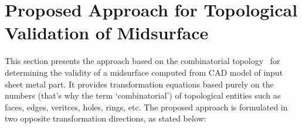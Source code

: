 \section{Proposed Approach for Topological Validation of Midsurface}

This section presents the approach based on the combinatorial topology~\cite{Hegde2013} for determining the validity of a midsurface computed from CAD model of input sheet metal part. It provides transformation equations based purely on the numbers (that's why the term `combinatorial') of topological entities such as faces, edges, veritces, holes, rings, etc.
The proposed approach is formulated in two opposite transformation directions, as stated below:


